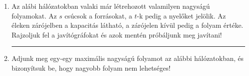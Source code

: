 \documentclass[a4paper, 12pt]{article}
\begin{document}
\begin{enumerate}
\begin{figure}[!h]
            \end{figure}
            \item Az alábi hálózatokban valaki már létrehozott valamilyen nagyságú folyamokat. Az $s$ csúcsok a forrásokat, a $t$-k pedig a nyelőket jelölik. Az éleken zárójelben a kapacitás látható, a zárójelen kívül pedig a folyam értéke. Rajzoljuk fel a javítógráfokat és azok mentén próbáljunk meg javítani!
            \begin{figure}[!h]
                \centering
                \begin{subfigure}{0.24\textwidth}
                    \centering		
                    
                \end{subfigure}
                \begin{subfigure}{0.24\textwidth}
                    \centering
                    
                \end{subfigure}
                \begin{subfigure}{0.24\textwidth}
                    \centering
                    
                \end{subfigure}
                \begin{subfigure}{0.24\textwidth}
                    \centering
                    
                \end{subfigure}
            \end{figure}

            \hrule
            
            \item Adjunk meg egy-egy maximális nagyságú folyamot az alábbi hálózatokban, és bizonyítsuk be, hogy nagyobb folyam nem lehetséges!
            \begin{figure}[!h]
                \centering
                \begin{subfigure}{0.4\textwidth}
                    \centering		
                    
                \end{subfigure}
                \begin{subfigure}{0.4\textwidth}
                    \centering
                    
                \end{subfigure}
            \end{figure}


\end{enumerate}
\end{document}
